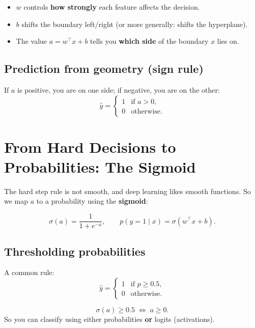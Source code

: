 \begin{tcolorbox}[colframe=blue!50!black,colback=blue!2,title=\textbf{\color{blue!70!black}Interpretation}]
\begin{itemize}[leftmargin=*]
  \item $w$ controls \textbf{how strongly} each feature affects the decision.
  \item $b$ shifts the boundary left/right (or more generally: shifts the hyperplane).
  \item The value $a = w^\top x + b$ tells you \textbf{which side} of the boundary $x$ lies on.
\end{itemize}
\end{tcolorbox}

\subsection{Prediction from geometry (sign rule)}
If $a$ is positive, you are on one side; if negative, you are on the other:
\[
\hat{y} =
\begin{cases}
1 & \text{if } a>0,\\
0 & \text{otherwise}.
\end{cases}
\]

\section{From Hard Decisions to Probabilities: The Sigmoid}

The hard step rule is not smooth, and deep learning likes smooth functions.
So we map $a$ to a probability using the \textbf{sigmoid}:

\[
\sigma(a)=\frac{1}{1+e^{-a}},
\qquad
p(y=1\mid x)=\sigma(w^\top x+b).
\]

\subsection{Thresholding probabilities}
A common rule:
\[
\hat{y} =
\begin{cases}
1 & \text{if } p\ge 0.5,\\
0 & \text{otherwise}.
\end{cases}
\]

\begin{tcolorbox}[colframe=purple!60!black,colback=purple!3,title=\textbf{\color{purple!70!black}Key equivalence (very important!)}]
\[
\sigma(a)\ge 0.5 \;\Longleftrightarrow\; a\ge 0.
\]
So you can classify using either probabilities \textbf{or} logits (activations).
\end{tcolorbox}

